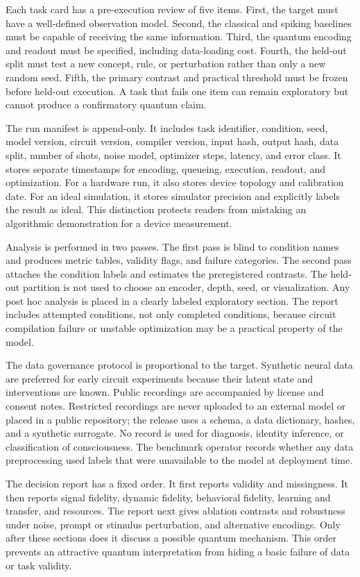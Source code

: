 \documentclass[conference]{IEEEtran}
\begin{document}
Each task card has a pre-execution review of five items. First, the target must have a
well-defined observation model. Second, the classical and spiking baselines must be
capable of receiving the same information. Third, the quantum encoding and readout must
be specified, including data-loading cost. Fourth, the held-out split must test a new
concept, rule, or perturbation rather than only a new random seed. Fifth, the primary
contrast and practical threshold must be frozen before held-out execution. A task that
fails one item can remain exploratory but cannot produce a confirmatory quantum claim.

The run manifest is append-only. It includes task identifier, condition, seed, model
version, circuit version, compiler version, input hash, output hash, data split, number
of shots, noise model, optimizer steps, latency, and error class. It stores separate
timestamps for encoding, queueing, execution, readout, and optimization. For a hardware
run, it also stores device topology and calibration date. For an ideal simulation, it
stores simulator precision and explicitly labels the result as ideal. This distinction
protects readers from mistaking an algorithmic demonstration for a device measurement.

Analysis is performed in two passes. The first pass is blind to condition names and
produces metric tables, validity flags, and failure categories. The second pass attaches
the condition labels and estimates the preregistered contrasts. The held-out partition
is not used to choose an encoder, depth, seed, or visualization. Any post hoc analysis
is placed in a clearly labeled exploratory section. The report includes attempted
conditions, not only completed conditions, because circuit compilation failure or
unstable optimization may be a practical property of the model.

The data governance protocol is proportional to the target. Synthetic neural data are
preferred for early circuit experiments because their latent state and interventions
are known. Public recordings are accompanied by license and consent notes. Restricted
recordings are never uploaded to an external model or placed in a public repository;
the release uses a schema, a data dictionary, hashes, and a synthetic surrogate. No
record is used for diagnosis, identity inference, or classification of consciousness.
The benchmark operator records whether any data preprocessing used labels that were
unavailable to the model at deployment time.

The decision report has a fixed order. It first reports validity and missingness. It
then reports signal fidelity, dynamic fidelity, behavioral fidelity, learning and
transfer, and resources. The report next gives ablation contrasts and robustness under
noise, prompt or stimulus perturbation, and alternative encodings. Only after these
sections does it discuss a possible quantum mechanism. This order prevents an attractive
quantum interpretation from hiding a basic failure of data or task validity.
\end{document}
